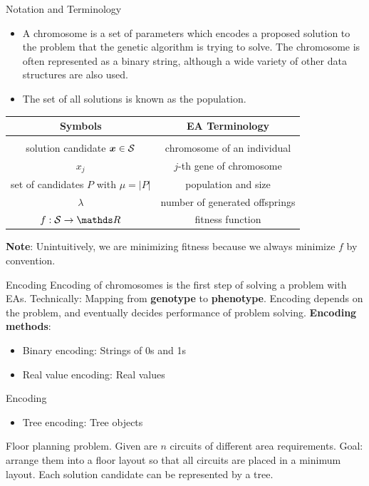 \documentclass[11pt,compress,t,notes=noshow, xcolor=table]{beamer}
\begin{document}
\begin{framev}[fs=small]{Notation and Terminology}
\begin{itemize}
\item A chromosome is a set of parameters which encodes a proposed solution to the problem that the genetic algorithm is trying to solve. The chromosome is often represented as a binary string, although a wide variety of other data structures are also used.\\
\item The set of all solutions is known as the population.
\end{itemize}
\spacer
\begin{center}
\begin{tabular}{c|c}
\textbf{Symbols} & \textbf{EA Terminology} \\
\hline\hline \\
solution candidate $\bm{x} \in \mathcal{S}$ & chromosome of an individual \\ [0.2em]
$x_j$  & $j$-th gene of chromosome \\[0.2em]
set of candidates $P$ with $\mu = |P|$ & population and size \\[0.2em]
$\lambda$ & number of generated offsprings \\[0.2em]
$f: \S \to \R$ & fitness function
\end{tabular}
\end{center}
\textbf{Note}: Unintuitively, we are minimizing fitness because we always minimize $f$ by convention.
\end{framev}


\begin{framev}{Encoding}
Encoding of chromosomes is the first step of solving a problem with EAs.
Technically: Mapping from \textbf{genotype} to \textbf{phenotype}.
Encoding depends on the problem, and eventually decides performance of problem solving.
\textbf{Encoding methods}:
\begin{itemize}
\item Binary encoding: Strings of 0s and 1s
\item Real value encoding: Real values
\end{itemize}
\end{framev}


\begin{framev}{Encoding}
\begin{itemize}
\item Tree encoding: Tree objects
\end{itemize}
\begin{small}
Floor planning problem. Given are $n$ circuits of different area requirements. Goal: arrange them into a floor layout so that all circuits are placed in a minimum layout. Each solution candidate can be represented by a tree.
\end{small}
\end{framev}
\end{document}
